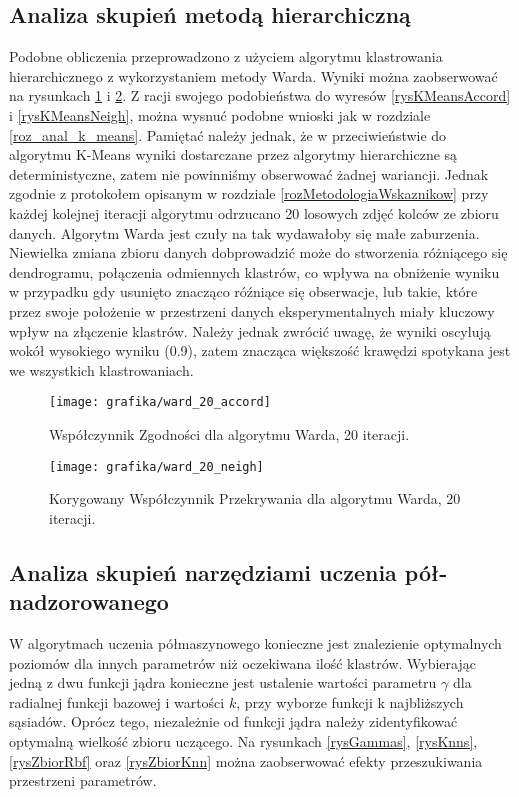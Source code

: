 \documentclass{article}
\begin{document}
\subsection{Analiza skupień metodą hierarchiczną}
\label{roz_anal_ward}
Podobne obliczenia przeprowadzono z użyciem algorytmu klastrowania hierarchicznego z wykorzystaniem metody Warda. 
Wyniki można zaobserwować na rysunkach \ref{rysWardAccord} i \ref{rysWardNeigh}.
Z racji swojego podobieństwa do wyresów \ref{rysKMeansAccord} i \ref{rysKMeansNeigh}, można wysnuć podobne wnioski jak w rozdziale \ref{roz_anal_k_means}.
Pamiętać należy jednak, że w  przeciwieństwie do algorytmu K-Means wyniki dostarczane przez algorytmy hierarchiczne są deterministyczne, zatem nie powinniśmy obserwować żadnej wariancji.
Jednak zgodnie z protokołem opisanym w rozdziale \ref{rozMetodologiaWskaznikow} przy każdej kolejnej iteracji algorytmu odrzucano 20 losowych zdjęć kolców ze zbioru danych.
Algorytm Warda jest czuły na tak wydawałoby się małe zaburzenia.
Niewielka zmiana zbioru danych dobprowadzić może do stworzenia różniącego się  dendrogramu, połączenia odmiennych klastrów, co wpływa na obniżenie wyniku w przypadku gdy usunięto znacząco róźniące się obserwacje, lub takie, które przez swoje położenie w przestrzeni danych eksperymentalnych miały kluczowy wpływ na złączenie klastrów.
Należy jednak zwrócić uwagę, że wyniki oscylują wokół wysokiego wyniku (0.9), zatem znacząca większość krawędzi spotykana jest we wszystkich klastrowaniach.
\begin{figure}
\texttt{[image: grafika/ward\_20\_accord]}
\caption{Współczynnik Zgodności dla algorytmu Warda, 20 iteracji.}
\label{rysWardAccord}

\end{figure}

\begin{figure}
\texttt{[image: grafika/ward\_20\_neigh]}
\caption{Korygowany Współczynnik Przekrywania dla algorytmu Warda, 20 iteracji.}
\label{rysWardNeigh}

\end{figure}

\FloatBarrier
\subsection{Analiza skupień narzędziami uczenia pół-nadzorowanego}
\label{roz_anal_semi}
W algorytmach uczenia półmaszynowego konieczne jest znalezienie optymalnych poziomów dla innych parametrów niż oczekiwana ilość klastrów. 
Wybierając jedną z dwu funkcji jądra konieczne jest ustalenie wartości parametru $\gamma$ dla radialnej funkcji bazowej i wartości $k$, przy wyborze funkcji k najbliższych sąsiadów.
Oprócz tego, niezależnie od funkcji jądra należy zidentyfikować optymalną wielkość zbioru uczącego.
Na rysunkach \ref{rysGammas}, \ref{rysKnns}, \ref{rysZbiorRbf} oraz \ref{rysZbiorKnn} można zaobserwować efekty przeszukiwania przestrzeni parametrów.
\end{document}
